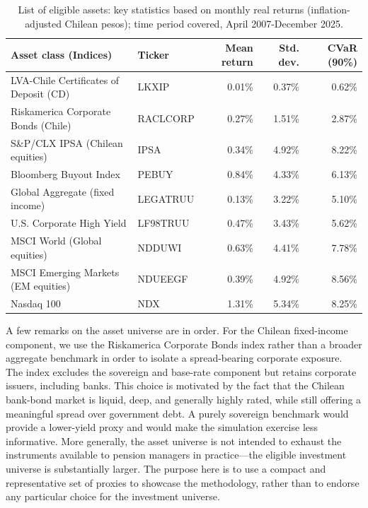 \documentclass[11pt]{article}
\begin{document}
\begin{table}[H]
  \centering
  \small
  \caption{List of eligible assets: key statistics based on monthly real returns (inflation-adjusted Chilean pesos); time period covered, April 2007-December 2025.}
  \label{tab:asset-universe}
  \begin{tabularx}{\textwidth}{@{}>{\raggedright\arraybackslash}X l r r r@{}}
    \toprule
    Asset class (Indices) & Ticker & Mean return & Std. dev. & CVaR (90\%) \\
    \midrule
    LVA-Chile Certificates of Deposit (CD) & LKXIP & 0.01\% & 0.37\% & 0.62\% \\
    Riskamerica Corporate Bonds (Chile) & RACLCORP & 0.27\% & 1.51\% & 2.87\% \\
    S\&P/CLX IPSA (Chilean equities) & IPSA & 0.34\% & 4.92\% & 8.22\% \\
    Bloomberg Buyout Index & PEBUY & 0.84\% & 4.33\% & 6.13\% \\
    Global Aggregate (fixed income) & LEGATRUU & 0.13\% & 3.22\% & 5.10\% \\
    U.S. Corporate High Yield & LF98TRUU & 0.47\% & 3.43\% & 5.62\% \\
    MSCI World (Global equities) & NDDUWI & 0.63\% & 4.41\% & 7.78\% \\
    MSCI Emerging Markets (EM equities) & NDUEEGF & 0.39\% & 4.92\% & 8.56\% \\
    Nasdaq 100 & NDX & 1.31\% & 5.34\% & 8.25\% \\
    \bottomrule
  \end{tabularx}
\end{table}

A few remarks on the asset universe are in order. For the Chilean 
fixed-income component, we use the Riskamerica Corporate Bonds
index rather than a broader aggregate benchmark in order to isolate 
a spread-bearing corporate exposure. The index excludes the sovereign 
and base-rate component but retains corporate issuers, including 
banks. This choice is motivated by the fact that the Chilean 
bank-bond market is liquid, deep, and generally highly rated, while 
still offering a meaningful spread over government debt. A purely 
sovereign benchmark would provide a lower-yield proxy and would make 
the simulation exercise less informative. More generally, the asset 
universe is not intended to exhaust the instruments available to 
pension managers in practice---the eligible investment universe is 
substantially larger. The purpose here is to use a compact and 
representative set of proxies to showcase the methodology, rather 
than to endorse any particular choice for the investment universe.
\end{document}
